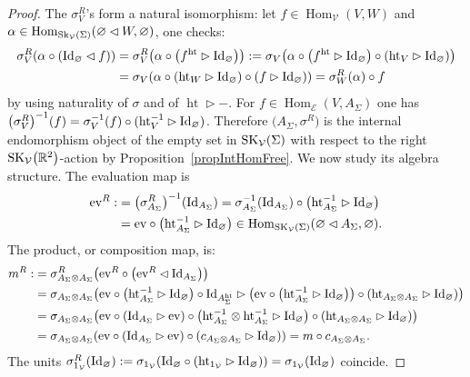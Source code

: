 \documentclass[pdftex]{sigma}%
\numberwithin{equation}{section}
\newcommand{\halft}{{\operatorname{ht}}}
\newcommand{\Hom}{\operatorname{Hom}}
\begin{document}
\begin{proof}
The $\sigma^R_V$'s form a natural isomorphism: let $f\in\Hom_\mathcal{V}(V,W)$ and $\alpha\in \Hom_{{\rm Sk}_\mathcal{V}(\Sigma)}(\varnothing \lhd W, \varnothing)$, one checks:
\begin{align*}
\sigma_V^R(\alpha \circ ({\rm Id}_\varnothing \lhd f)) &= \sigma_V^R\big(\alpha \circ \big(f^\halft \rhd {\rm Id}_\varnothing\big)\big) := \sigma_V\big(\alpha \circ \big(f^\halft \rhd {\rm Id}_\varnothing\big) \circ (\halft_V \rhd {\rm Id}_\varnothing)\big)
\\
&= \sigma_V(\alpha \circ (\halft_W \rhd {\rm Id}_\varnothing) \circ (f \rhd {\rm Id}_\varnothing)) = \sigma_W^R(\alpha) \circ f
\end{align*}
by using naturality of $\sigma$ and of $\halft\rhd -$. For $f \in \Hom_\mathcal{E}(V,A_\Sigma)$ one has $\big(\sigma^R_V\big)^{-1}(f) = \sigma_V^{-1}(f) \circ (\halft_V^{-1} \rhd {\rm Id}_\varnothing)$.
Therefore $\big(A_\Sigma,\sigma^R\big)$ is the internal endomorphism object of the empty set in ${\rm SK}_\mathcal{V}(\Sigma)$ with respect to the right ${\rm SK}_\mathcal{V}\big(\mathbb{R}^2\big)$-action by
 Proposition~\ref{propIntHomFree}. We now study its algebra structure.
The evaluation map is
\begin{align*}
{\rm ev}^R :&= \big(\sigma^R_{A_\Sigma}\big)^{-1}({\rm Id}_{A_\Sigma}) = \sigma_{A_\Sigma}^{-1}({\rm Id}_{A_\Sigma}) \circ \big(\halft_{A_\Sigma}^{-1} \rhd {\rm Id}_\varnothing\big)
\\
&={\rm ev} \circ \big(\halft_{A_\Sigma}^{-1} \rhd {\rm Id}_\varnothing\big) \in \Hom_{{\rm SK}_\mathcal{V}(\Sigma)}(\varnothing \lhd A_\Sigma, \varnothing).
\end{align*}
The product, or composition map, is:
\begin{align*}
m^R :&= \sigma^R_{A_\Sigma \otimes A_\Sigma}\big({\rm ev}^R\circ \big({\rm ev}^R \lhd {\rm Id}_{A_\Sigma}\big)\big)
\\
&= \sigma_{A_\Sigma \otimes A_\Sigma}\big({\rm ev} \circ \big(\halft_{A_\Sigma}^{-1} \rhd {\rm Id}_\varnothing\big) \circ {\rm Id}_{A_\Sigma^\halft}\rhd\big({\rm ev} \circ \big(\halft_{A_\Sigma}^{-1} \rhd {\rm Id}_\varnothing\big)\big)\circ (\halft_{A_\Sigma \otimes A_\Sigma}\rhd {\rm Id}_\varnothing)\big)
\\
 &=\sigma_{A_\Sigma \otimes A_\Sigma}\big({\rm ev} \circ ({\rm Id}_{A_\Sigma}\rhd {\rm ev}) \circ \big(\halft_{A_\Sigma}^{-1}\otimes\halft_{A_\Sigma}^{-1} \rhd {\rm Id}_\varnothing\big)\circ (\halft_{A_\Sigma \otimes A_\Sigma}\rhd {\rm Id}_\varnothing)\big)
\\
&=\sigma_{A_\Sigma \otimes A_\Sigma}({\rm ev} \circ ({\rm Id}_{A_\Sigma}\rhd {\rm ev}) \circ (c_{A_\Sigma \otimes A_\Sigma} \rhd {\rm Id}_\varnothing))
= m \circ c_{A_\Sigma \otimes A_\Sigma}.
\end{align*}
The units $\sigma^R_{1_\mathcal{V}}({\rm Id}_\varnothing) := \sigma_{1_\mathcal{V}}({\rm Id}_\varnothing \circ (\halft_{1_\mathcal{V}} \rhd {\rm Id}_\varnothing))= \sigma_{1_\mathcal{V}}({\rm Id}_\varnothing)$ coincide.
\end{proof}
\end{document}
